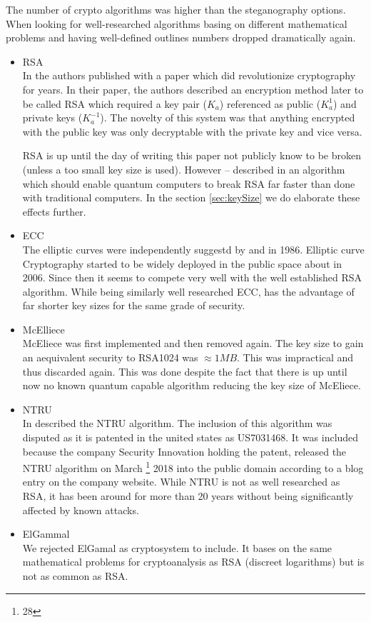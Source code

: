 The number of crypto algorithms was higher than the steganography options. When looking for well-researched algorithms basing on different mathematical problems and having well-defined outlines numbers dropped dramatically again.

\begin{itemize}
	\item RSA\\
		  In \citeyear{Rivest:1978:MOD:359340.359342} the authors \citeauthor{Rivest:1978:MOD:359340.359342} published with \cite{Rivest:1978:MOD:359340.359342} a paper which did revolutionize cryptography for years. In their paper, the authors described an encryption method later to be called RSA which required a key pair ($K_a$) referenced as public ($K^{1}_a$) and private keys ($K^{-1}_a$). The novelty of this system was that anything encrypted with the public key was only decryptable with the private key and vice versa.
		  
		  RSA is up until the day of writing this paper not publicly know to be broken (unless a too small key size is used). However -- \citeauthor{Shor97polynomial-timealgorithms} described in \citeyear{Shor97polynomial-timealgorithms} an algorithm which should enable quantum computers to break RSA far faster than done with traditional computers. In the section \ref{sec:keySize} we do elaborate these effects further.
	\item ECC\\
	      The elliptic curves were independently suggestd by \cite{Miller1986} and \cite{Koblitz04guideto} in 1986. Elliptic curve Cryptography started to be widely deployed in the public space about in 2006. Since then it seems to compete very well with the well established RSA algorithm. While being similarly well researched ECC, has the advantage of far shorter key sizes for the same grade of security.
	\item McElliece\\
	      McEliece was first implemented and then removed again. The key size to gain an aequivalent security to RSA1024 was $\approx 1MB$. This was impractical and thus discarded again. This was done despite the fact that there is up until now no known quantum capable algorithm reducing the key size of McEliece.
	\item NTRU\\
	      In \cite{Hoffstein1998} \citeauthor{Hoffstein1998} described the NTRU algorithm. The inclusion of this algorithm was disputed as it is patented in the united states as US7031468. It was included because the company Security Innovation holding the patent, released the NTRU algorithm on March \thanks{28} 2018 into the public domain according to a blog entry on the company website. While NTRU is not as well researched as RSA, it has been around for more than 20 years without being significantly affected by known attacks.
	\item ElGammal\\
	      We rejected ElGamal as cryptosystem to include. It bases on the same mathematical problems for cryptoanalysis as RSA (discreet logarithms) but is not as common as RSA.
\end{itemize}


